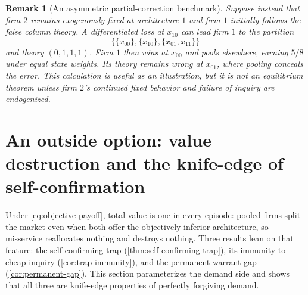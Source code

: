 \documentclass[11pt]{article}
\newtheorem{remark}[assumption]{Remark}
\begin{document}
\begin{remark}[An asymmetric partial-correction benchmark]
Suppose instead that firm $2$ remains exogenously fixed at architecture $1$ and
firm $1$ initially follows the false column theory.  A differentiated loss at
$x_{10}$ can lead firm $1$ to the partition
\[
\big\{\{x_{00}\},\{x_{10}\},\{x_{01},x_{11}\}\big\}
\]
and theory $(0,1,1,1)$.  Firm $1$ then wins at $x_{00}$ and pools elsewhere,
earning $5/8$ under equal state weights.  Its theory remains wrong at $x_{01}$,
where pooling conceals the error.  This calculation is useful as an
illustration, but it is not an equilibrium theorem unless firm $2$'s continued
fixed behavior and failure of inquiry are endogenized.
\end{remark}

\section{An outside option: value destruction and the knife-edge of
self-confirmation}
\label{sec:outside-option}

Under \cref{eq:objective-payoff}, total value is one in every episode: pooled
firms split the market even when both offer the objectively inferior
architecture, so misservice reallocates nothing and destroys nothing.  Three
results lean on that feature: the self-confirming trap
(\cref{thm:self-confirming-trap}), its immunity to cheap inquiry
(\cref{cor:trap-immunity}), and the permanent warrant gap
(\cref{cor:permanent-gap}).  This section parameterizes the demand side and
shows that all three are knife-edge properties of perfectly forgiving demand.
\end{document}
